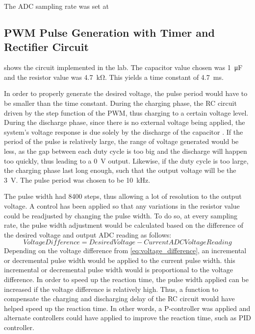 \documentclass[a4paper,titlepage]{article}
\begin{document}
The ADC sampling rate was set at 

\subsection{PWM Pulse Generation with Timer and Rectifier Circuit}
 shows the circuit implemented in the lab. The capacitor value chosen was \SI{1}{\micro\farad} and the resistor value was \SI{4.7}{\kilo\ohm}. This yields a time constant of \SI{4.7}{\milli \second}.

In order to properly generate the desired voltage, the pulse period would have to be smaller than the time constant. During the charging phase, the RC circuit driven by the step function of the PWM, thus charging to a certain voltage level. During the discharge phase, since there is no external voltage being applied, the system's voltage response is due solely by the discharge of the capacitor \cite{pwm_rc_citation}. If the period of the pulse is relatively large, the range of voltage generated would be less, as the gap between each duty cycle is too big and the discharge will happen too quickly, thus leading to a \SI{0}{\volt} output. Likewise, if the duty cycle is too large, the charging phase last long enough, such that the output voltage will be the \SI{3}{\volt}. The pulse period was chosen to be \SI{10}{\kilo \hertz}.


The pulse width had 8400 steps, thus allowing a lot of resolution to the output voltage. A control has been applied so that any variations in the resistor value could be readjusted by changing the pulse width. To do so, at every sampling rate, the pulse width adjustment would be calculated based on the difference of the desired voltage and output ADC reading as follows:
\begin{equation}
Voltage Difference = Desired Voltage - Current ADC Voltage Reading
\label{eq:voltage_difference}
\end{equation}
Depending on the voltage difference from \eqref{eq:voltage_difference}, an incremental or decremental pulse width would be applied to the current pulse width. this incremental or decremental pulse width would is proportional to the voltage difference. In order to speed up the reaction time, the pulse width applied can be increased if the voltage difference is relatively high. Thus, a function to compensate the charging and discharging delay of the RC circuit would have helped speed up the reaction time. In other words, a P-controller was applied and alternate controllers could have applied to improve the reaction time, such as PID controller.
\end{document}
